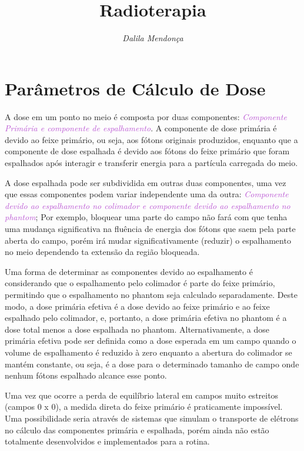 \documentclass[11pt,a4paper]{article}
\title{\LobsterTwo\Huge{Radioterapia}}
\author{\LobsterTwo{Parâmetros e Cálculos De Unidades Monitoras}\nocite{*}}
\date{\LobsterTwo\textit{Dalila Mendonça}}
\newcounter{exemplo}
\begin{document}
	\maketitle

    \section{Parâmetros de Cálculo de Dose}

    A dose em um ponto no meio é composta por duas componentes: \textit{\textcolor{MediumOrchid}{Componente Primária e componente de espalhamento}}. A componente de dose primária é devido ao feixe primário, ou seja, aos fótons originais produzidos, enquanto que a componente de  dose espalhada é devido aos fótons do feixe primário que foram espalhados após interagir e transferir energia para a partícula carregada do meio.

    A dose espalhada pode ser subdividida em outras duas componentes, uma vez que essas componentes podem variar independente uma da outra: \textit{\textcolor{MediumOrchid}{Componente devido ao espalhamento no colimador e componente devido ao espalhamento no phantom}}; Por exemplo, bloquear uma parte do campo não fará com que tenha uma mudança significativa na fluência de energia dos fótons que saem pela parte aberta do campo, porém irá mudar significativamente (reduzir) o espalhamento no meio dependendo ta extensão da região bloqueada.

    Uma forma de determinar as componentes devido ao espalhamento é considerando que o espalhamento pelo colimador é parte do feixe primário, permitindo que o espalhamento no phantom seja calculado separadamente. Deste modo, a dose primária efetiva é a dose devido ao feixe primário e ao feixe espalhado pelo colimador, e, portanto, a dose primária efetiva no phantom é a dose total menos a dose espalhada no phantom. Alternativamente, a dose primária efetiva pode ser definida como a dose esperada em um campo quando o volume de espalhamento é reduzido à zero enquanto a abertura do colimador se mantém constante, ou seja, é a dose para o determinado tamanho de campo onde nenhum fótons espalhado alcance esse ponto. 

    Uma vez que ocorre a perda de equilíbrio lateral em campos muito estreitos (campos 0 x 0), a medida direta do feixe primário é praticamente impossível. Uma possibilidade seria através de sistemas que simulam o transporte de elétrons no cálculo das componentes primária e espalhada, porém ainda não estão totalmente desenvolvidos e implementados para a rotina. 
\end{document}
